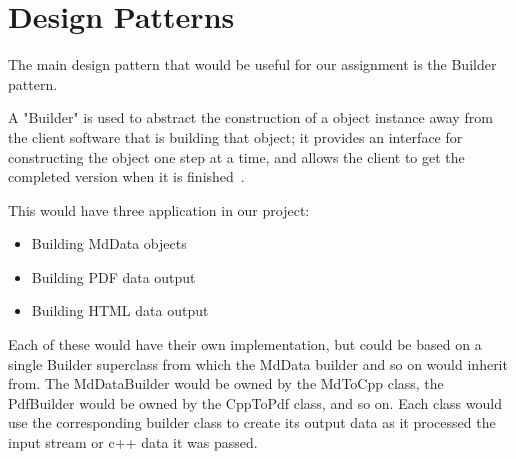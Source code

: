 \section{Design Patterns}

The main design pattern that would be useful for our assignment is the Builder pattern.

A "Builder" is used to abstract the construction of a object instance away from the client software that is building that object; it provides an interface for constructing the object one step at a time, and allows the client to get the completed version when it is finished~\cite{designpatterns}.

This would have three application in our project: 
\begin{itemize}
  \item Building MdData objects
  \item Building PDF data output
  \item Building HTML data output
\end{itemize}

Each of these would have their own implementation, but could be based on a single Builder superclass from which the MdData builder and so on would inherit from. The MdDataBuilder would be owned by the MdToCpp class, the PdfBuilder would be owned by the CppToPdf class, and so on. Each class would use the corresponding builder class to create its output data as it processed the input stream or c++ data it was passed.

